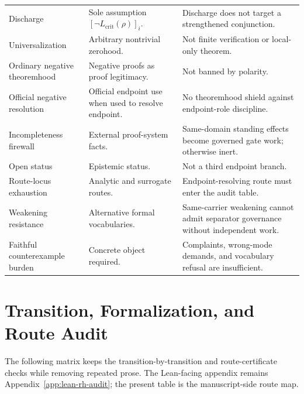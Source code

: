 \documentclass[11pt]{article}
\newcommand{\Lcrit}{L_{\mathrm{crit}}}
\begin{document}
\begin{longtable}{L{0.23\textwidth}L{0.34\textwidth}L{0.33\textwidth}}
Discharge & Sole assumption \([\neg\Lcrit(\rho)]_i\). & Discharge does not target a strengthened conjunction.\\
Universalization & Arbitrary nontrivial zerohood. & Not finite verification or local-only theorem.\\
Ordinary negative theoremhood & Negative proofs as proof legitimacy. & Not banned by polarity.\\
Official negative resolution & Official endpoint use when used to resolve endpoint. & No theoremhood shield against endpoint-role discipline.\\
Incompleteness firewall & External proof-system facts. & Same-domain standing effects become governed gate work; otherwise inert.\\
Open status & Epistemic status. & Not a third endpoint branch.\\
Route-locus exhaustion & Analytic and surrogate routes. & Endpoint-resolving route must enter the audit table.\\
Weakening resistance & Alternative formal vocabularies. & Same-carrier weakening cannot admit separator governance without independent work.\\
Faithful counterexample burden & Concrete object required. & Complaints, wrong-mode demands, and vocabulary refusal are insufficient.\\
\bottomrule
\end{longtable}
\endgroup

\section{Transition, Formalization, and Route Audit}\label{app:formalization}

The following matrix keeps the transition-by-transition and route-certificate checks while removing repeated prose.  The Lean-facing appendix remains Appendix~\ref{app:lean-rh-audit}; the present table is the manuscript-side route map.
\end{document}
